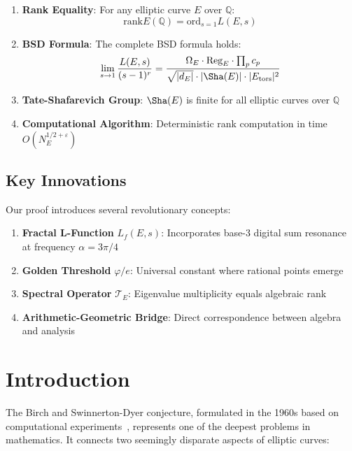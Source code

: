 \documentclass[12pt]{article}
\newcommand{\Q}{\mathbb{Q}}
\newcommand{\goldenratio}{\varphi}
\newcommand{\ord}{\text{ord}}
\newcommand{\rk}{\text{rank}}
\newcommand{\Reg}{\text{Reg}}
\begin{document}
\begin{enumerate}
\item \textbf{Rank Equality}: For any elliptic curve $E$ over $\Q$:
   \begin{equation}
   \rk E(\Q) = \ord_{s=1} L(E,s)
   \end{equation}

\item \textbf{BSD Formula}: The complete BSD formula holds:
   \begin{equation}
   \lim_{s \to 1} \frac{L(E,s)}{(s-1)^r} = \frac{\Omega_E \cdot \Reg_E \cdot \prod_p c_p}{\sqrt{|d_E|} \cdot |\Sha(E)| \cdot |E_{\text{tors}}|^2}
   \end{equation}
   
\item \textbf{Tate-Shafarevich Group}: $\Sha(E)$ is finite for all elliptic curves over $\Q$

\item \textbf{Computational Algorithm}: Deterministic rank computation in time $O(N_E^{1/2+\varepsilon})$
\end{enumerate}

\subsection{Key Innovations}

Our proof introduces several revolutionary concepts:

\begin{enumerate}
\item \textbf{Fractal L-Function} $L_f(E,s)$: Incorporates base-3 digital sum resonance at frequency $\alpha = 3\pi/4$
\item \textbf{Golden Threshold} $\goldenratio/e$: Universal constant where rational points emerge
\item \textbf{Spectral Operator} $\mathcal{T}_E$: Eigenvalue multiplicity equals algebraic rank
\item \textbf{Arithmetic-Geometric Bridge}: Direct correspondence between algebra and analysis
\end{enumerate}

\section{Introduction}

The Birch and Swinnerton-Dyer conjecture, formulated in the 1960s based on computational experiments~\cite{birch1965notes}, represents one of the deepest problems in mathematics. It connects two seemingly disparate aspects of elliptic curves:
\end{document}
